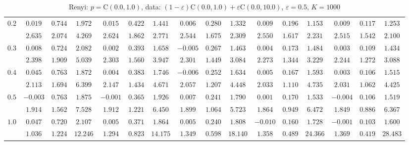 \documentclass[11pt]{article}
\begin{document}
\begin{table}[ht]
\begin{center}
\begin{tabular}{|c|ccc|ccc|ccc|ccc|ccc|}
\hline 
$0.2$ & $ 0.019 $ & $ 0.744 $ & $ 1.972 $ & $ 0.015 $ & $ 0.422 $ & $ 1.441 $ & $ 0.006 $ & $ 0.280 $ & $ 1.332 $ & $ 0.009 $ & $ 0.196 $ & $ 1.153 $ & $ 0.009 $ & $ 0.117 $ & $ 1.253 $\\ 
 & $ 2.635 $ & $ 2.074 $ & $ 4.269 $ & $ 2.624 $ & $ 1.862 $ & $ 2.771 $ & $ 2.544 $ & $ 1.675 $ & $ 2.309 $ & $ 2.550 $ & $ 1.617 $ & $ 2.231 $ & $ 2.515 $ & $ 1.542 $ & $ 2.100 $\\ 
\hline 
$0.3$ & $ 0.008 $ & $ 0.724 $ & $ 2.082 $ & $ 0.002 $ & $ 0.393 $ & $ 1.658 $ & $ -0.005 $ & $ 0.267 $ & $ 1.463 $ & $ 0.004 $ & $ 0.173 $ & $ 1.484 $ & $ 0.003 $ & $ 0.109 $ & $ 1.434 $\\ 
 & $ 2.398 $ & $ 1.909 $ & $ 5.039 $ & $ 2.303 $ & $ 1.560 $ & $ 3.947 $ & $ 2.301 $ & $ 1.449 $ & $ 3.084 $ & $ 2.273 $ & $ 1.344 $ & $ 3.229 $ & $ 2.244 $ & $ 1.272 $ & $ 3.088 $\\ 
\hline 
$0.4$ & $ 0.045 $ & $ 0.763 $ & $ 1.872 $ & $ 0.004 $ & $ 0.383 $ & $ 1.746 $ & $ -0.006 $ & $ 0.252 $ & $ 1.634 $ & $ 0.005 $ & $ 0.167 $ & $ 1.593 $ & $ 0.003 $ & $ 0.106 $ & $ 1.515 $\\ 
 & $ 2.113 $ & $ 1.694 $ & $ 6.399 $ & $ 2.147 $ & $ 1.434 $ & $ 4.671 $ & $ 2.057 $ & $ 1.207 $ & $ 4.448 $ & $ 2.033 $ & $ 1.110 $ & $ 4.735 $ & $ 2.031 $ & $ 1.062 $ & $ 4.425 $\\ 
\hline 
$0.5$ & $ -0.003 $ & $ 0.763 $ & $ 1.875 $ & $ -0.001 $ & $ 0.365 $ & $ 1.926 $ & $ 0.007 $ & $ 0.241 $ & $ 1.790 $ & $ 0.001 $ & $ 0.170 $ & $ 1.533 $ & $ -0.004 $ & $ 0.106 $ & $ 1.519 $\\ 
 & $ 1.914 $ & $ 1.562 $ & $ 7.528 $ & $ 1.912 $ & $ 1.221 $ & $ 6.450 $ & $ 1.899 $ & $ 1.064 $ & $ 5.723 $ & $ 1.864 $ & $ 0.949 $ & $ 6.472 $ & $ 1.849 $ & $ 0.886 $ & $ 6.367 $\\ 
\hline 
$1.0$ & $ 0.047 $ & $ 0.720 $ & $ 2.107 $ & $ 0.005 $ & $ 0.371 $ & $ 1.864 $ & $ 0.005 $ & $ 0.240 $ & $ 1.808 $ & $ -0.010 $ & $ 0.160 $ & $ 1.728 $ & $ -0.001 $ & $ 0.103 $ & $ 1.600 $\\ 
 & $ 1.036 $ & $ 1.224 $ & $ 12.246 $ & $ 1.294 $ & $ 0.823 $ & $ 14.175 $ & $ 1.349 $ & $ 0.598 $ & $ 18.140 $ & $ 1.358 $ & $ 0.489 $ & $ 24.366 $ & $ 1.369 $ & $ 0.419 $ & $ 28.483 $\\ 
\hline 
\end{tabular}
\caption{Renyi: $p = \mathrm{C}(0.0,1.0)$, data: $(1-\varepsilon)\mathrm{C}(0.0,1.0) + \varepsilon \mathrm{C}(0.0,10.0)$, $\varepsilon =  0.5$, $K = 1000$} 
\end{center}
\end{table}
\end{document}
